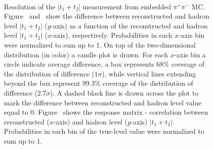 \begin{figure}[h]
{}%
\quad\quad%
\parbox{0.4725\textwidth}{
  \centering
  \begin{subfigure}[b]{\linewidth}\addtocounter{subfigure}{-2}\vspace*{-12pt}
  \end{subfigure}\\
    \begin{minipage}[t][1.042\linewidth][t]{\linewidth}\vspace{10pt}
    \caption[Resolution of the $|t_{1}+t_{2}|$ measurement from embedded $\pi^{+}\pi^{-}$ MC.]{Resolution of the $|t_{1}+t_{2}|$ measurement from embedded $\pi^{+}\pi^{-}$ MC. Figure~ and~ show the difference between reconstructed and hadron level $|t_{1}+t_{2}|$ ($y$-axis) as a function of the reconstructed and hadron level $|t_{1}+t_{2}|$ ($x$-axis), respectively. Probabilities in each $x$-axis bin were normalized to sum up to 1. On top of the two-dimensional distribution (in color) a candle plot is drawn. For each $x$-axis bin a circle indicate average difference, a box represents 68\% coverage of the distribution of difference ($1\sigma$), while vertical lines extending beyond the box represent 99.3\% coverage of the distribution of difference ($2.7\sigma$). A dashed black line is drawn across the plot to mark the difference between reconstructed and hadron level value equal to 0. Figure~ shows the response matrix - correlation between reconstructed ($x$-axis) and hadron level ($y$-axis) $|t_{1}+t_{2}|$. Probabilities in each bin of the true-level value were normalized to sum up to 1.}\label{fig:Response_MandelstamTSum}%
  \end{minipage}
}%
\end{figure}




